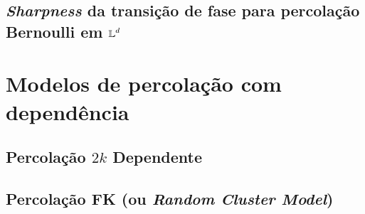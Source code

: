 

\subsection{\textit{Sharpness} da transição de fase para percolação Bernoulli em $\operatorname{\mathbb{L}}^d$} \label{subsection-exp-decay}



\section{Modelos de percolação com dependência} \label{Monotonic-measures} \vspace{24pt}



\subsection{Percolação $2k$ Dependente}



\subsection{Percolação FK (ou \textit{Random Cluster Model})}\label{random-cluster-model}


